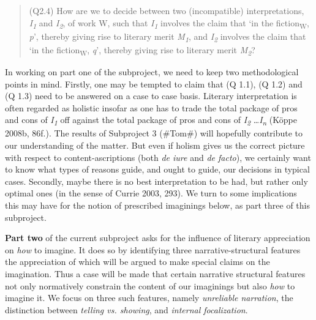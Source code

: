 \vspace{-.2cm}
\begin{quote}
(Q2.4)  How are we to decide between two (incompatible)
interpretations, \emph{I\textsubscript{1}} and
\emph{I\textsubscript{2}}, of work W, such  that
\emph{I\textsubscript{1}} involves the claim that `in the
fiction\textsubscript{W}, \emph{p}', thereby giving rise to literary
merit \emph{M\textsubscript{1}}, and  \emph{I\textsubscript{2}}
involves the claim that `in the fiction\textsubscript{W}, \emph{q}',
thereby giving rise to literary merit \emph{M\textsubscript{2}}?
\end{quote}
\vspace{-.2cm}

\noindent In working on part one of the subproject, we need to keep two
methodological points in mind. Firstly, one may be tempted to claim that
(Q 1.1), (Q 1.2) and (Q 1.3) need to be answered on a case to case
basis. Literary interpretation is often regarded as holistic insofar as
one has to trade the total package of pros and cons of
\emph{I\textsubscript{1}} off against the total package of pros and cons
of \emph{I\textsubscript{2}} \ldots \emph{I\textsubscript{n}} (K\"oppe
2008b, 86f.). The results of {Subproject 3 (\#Tom\#)} will hopefully
contribute to our understanding of the matter. But even if holism gives
us the correct picture with respect to content-ascriptions (both
\emph{de iure} and \emph{de facto}), we certainly want to know what
types of reasons guide, and ought to guide, our decisions in typical
cases. Secondly, maybe there is no best interpretation to be had, but
rather only optimal ones (in the sense of Currie 2003, 293). We turn to
some implications this may have for the notion of prescribed imaginings
below, as part three of this subproject.

\textbf{Part two} of the current subproject asks for the influence of
literary appreciation on \emph{how} to imagine. It does so by
identifying three narrative-structural features the appreciation of
which will be argued to make special claims on the imagination. Thus a
case will be made that certain narrative structural features not only
normatively constrain the content of our imaginings but also \emph{how}
to imagine it. We focus on three such features, namely \emph{unreliable
narration}, the distinction between \emph{telling vs. showing}, and
\emph{internal focalization}.

